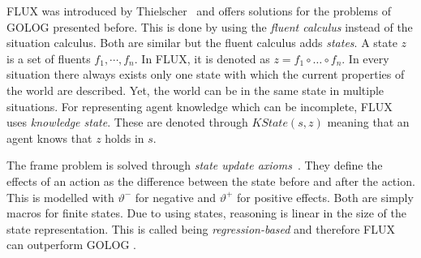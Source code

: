 \lstset{style=flux} %
FLUX was introduced by Thielscher~\cite{thielscher_flux:_2005} and offers solutions for the problems of GOLOG presented before. This is done by using the \emph{fluent calculus} instead of the situation calculus. Both are similar but the fluent calculus adds \emph{states}. A state $z$ is a set of fluents $f_1,\cdots,f_n$. In FLUX, it is denoted as $z = f_1 \circ \ldots \circ f_n$. In every situation there always exists only one state with which the current properties of the world are described. Yet, the world can be in the same state in multiple situations. For representing agent knowledge which can be incomplete, FLUX uses \emph{knowledge state}. These are denoted through $\textit{KState}(s,z)$ meaning that an agent knows that $z$ holds in $s$.

The frame problem is solved through \emph{state update axioms}~\cite{thielscher_situation_1999}. They define the effects of an action as the difference between the state before and after the action. This is modelled with $\vartheta^-$ for negative and $\vartheta^+$ for positive effects. Both are simply macros for finite states. Due to using states, reasoning is linear in the size of the state representation. This is called being \emph{regression-based} and therefore FLUX can outperform GOLOG \cite{thielscher_flux:_2005}.

